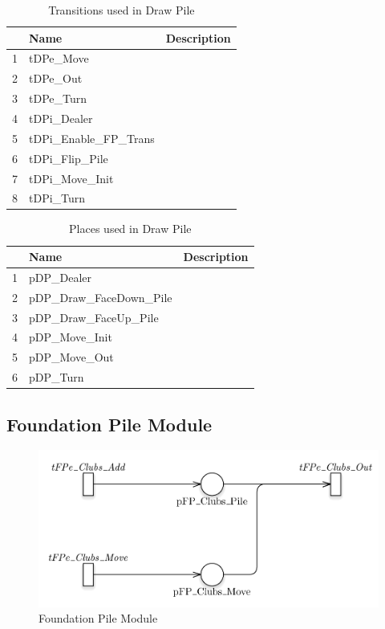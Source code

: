 \documentclass[runningheads,a4paper]{llncs}
\begin{document}
\begin{table}
	\caption{Transitions used in Draw Pile}
	\begin{tabular}{|l|l|l|}
		\hline
		& Name & Description \\
		\hline
		1  & tDPe\_Move               &    \\ \hline
		2  & tDPe\_Out                &    \\ \hline
		3  & tDPe\_Turn               &    \\ \hline
		4  & tDPi\_Dealer             &    \\ \hline
		5  & tDPi\_Enable\_FP\_Trans  &    \\ \hline
		6  & tDPi\_Flip\_Pile         &    \\ \hline
		7  & tDPi\_Move\_Init         &    \\ \hline
		8  & tDPi\_Turn               &    \\ \hline
	\end{tabular}
\end{table}
\begin{table}
	\caption{Places used in Draw Pile}
	\begin{tabular}{|l|l|l|}
		\hline
		& Name & Description \\
		\hline
		1  & pDP\_Dealer               &  \\ \hline
		2  & pDP\_Draw\_FaceDown\_Pile &  \\ \hline
		3  & pDP\_Draw\_FaceUp\_Pile   &  \\ \hline
		4  & pDP\_Move\_Init           &  \\ \hline
		5  & pDP\_Move\_Out            &  \\ \hline
		6  & pDP\_Turn                 &  \\ \hline
	\end{tabular}
\end{table}
\subsection{Foundation Pile Module}
\begin{figure}
	\begin{center}
		\includegraphics[width=\textwidth]{images/foundationPile}
		\caption{Foundation Pile Module}
	\end{center}
\end{figure}
\end{document}
